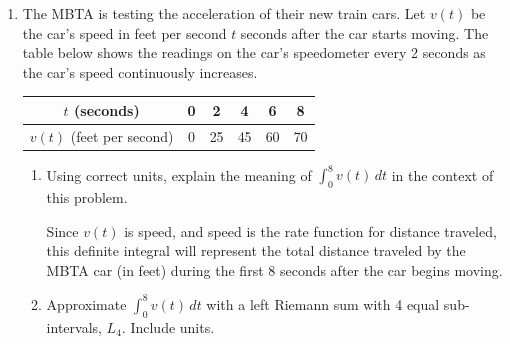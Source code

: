 \documentclass{article}
\begin{document}
\begin{enumerate}
\begin{enumerate}
\begin{solution}
    By the Fundamental Theorem of Calculus, we know that an area function defined in this way will be changing at a rate of .
\end{solution}
    \item 
    \begin{problem}
    $B(x)=\displaystyle \int_0^x e^t\,dt -\int_2^x e^t\,dt$
    \end{problem}
    \begin{solution}
        Through properties of the definite integral, we can simplify this into: 
        $\displaystyle \int_0^x e^t\,dt -\int_2^x e^t\,dt = \int_0^x e^t\,dt +\int_x^2 e^t\,dt = \int_0^2 e^t \, dt$
        This is evaluates to a constant. The derivative of a constant is 
    \end{solution}
    
\end{enumerate}

\pspace{\newpage}

\item %
\begin{problem}
 The MBTA is testing the acceleration of their new train cars. Let $v(t)$ be the car's speed in feet per second $t$ seconds after the car starts moving. The table below shows the readings on the car's speedometer every 2 seconds as the car's speed continuously increases.

    
    \begin{tabular}{c|c|c|c|c|c}
        $t$ (seconds) &  0 & 2 & 4 & 6 & 8 \\
        \hline
        $v(t)$ (feet per second) & 0 & 25 & 45 & 60 & 70
    \end{tabular}

 \end{problem}
    \begin{enumerate}
        \item 
        \begin{problem}
        Using correct units, explain the meaning of $\displaystyle \int_0^8 v(t)\,dt$ in the context of this problem.
        \end{problem}
        \pspace{\vfill}

        \begin{solution}
            Since $v(t)$ is speed, and speed is the rate function for distance traveled, this definite integral will represent the total distance traveled by the MBTA car (in feet) during the first 8 seconds after the car begins moving.
        \end{solution}
        \item 
        \begin{problem}
        Approximate $\displaystyle \int_0^8 v(t)\,dt$ with a left Riemann sum with 4 equal sub-intervals, $L_4$. Include units.
        \end{problem}
        \pspace{\vfill}


\end{enumerate}
\end{enumerate}
\end{document}

